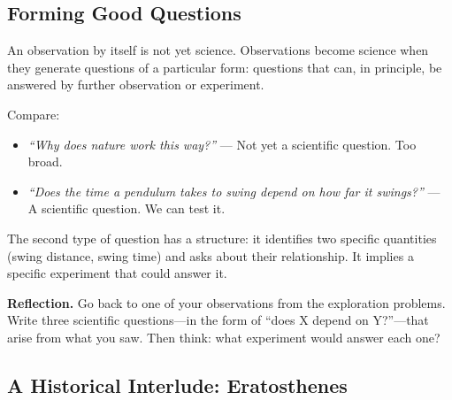 \documentclass[12pt, a4paper, twoside]{book}
\newcounter{problem}[chapter]
\theoremstyle{disc}
\begin{document}
\subsection{Forming Good Questions}

An observation by itself is not yet science. Observations become science when they generate questions of a particular form: questions that can, in principle, be answered by further observation or experiment.

Compare:
\begin{itemize}
  \item \textit{``Why does nature work this way?''} --- Not yet a scientific question. Too broad.
  \item \textit{``Does the time a pendulum takes to swing depend on how far it swings?''} --- A scientific question. We can test it.
\end{itemize}

The second type of question has a structure: it identifies two specific quantities (swing distance, swing time) and asks about their relationship. It implies a specific experiment that could answer it.

\begin{reflectionbox}
\textbf{Reflection.} Go back to one of your observations from the exploration problems. Write three scientific questions---in the form of ``does X depend on Y?''---that arise from what you saw. Then think: what experiment would answer each one?
\end{reflectionbox}

\subsection{A Historical Interlude: Eratosthenes}
\end{document}
